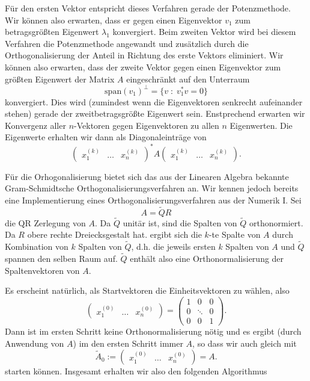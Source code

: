 \documentclass[12pt,a4paper]{book}
\theoremstyle{break}
\theoremstyle{nonumberplain}
\newcommand{\1}{\mathbbm{1}} 			      	%
\newcommand{\dd}{\; : \;}    			      	%
\begin{document}
Für den ersten Vektor entspricht dieses Verfahren gerade der Potenzmethode. Wir können also erwarten, dass er gegen einen Eigenvektor $v_1$
zum betragsgrößten Eigenwert $\lambda_1$ konvergiert. Beim zweiten Vektor wird bei diesem Verfahren die Potenzmethode angewandt und zusätzlich
durch die Orthogonalisierung der Anteil in Richtung des erste Vektors eliminiert. Wir können also erwarten, dass der zweite Vektor gegen einen Eigenvektor zum größten
Eigenwert der Matrix $A$ eingeschränkt auf den Unterraum
\[
\mathrm{span}(v_1)^\perp=\{ v\dd v_1^* v=0\}
\]
konvergiert. Dies wird (zumindest wenn die Eigenvektoren senkrecht aufeinander stehen) gerade der zweitbetragsgrößte Eigenwert sein. Enstprechend erwarten wir Konvergenz
aller $n$-Vektoren gegen Eigenvektoren zu allen $n$ Eigenwerten.
Die Eigenwerte erhalten wir dann als Diagonaleinträge von 
\[
\begin{pmatrix} x^{(k)}_1 & \ldots & x^{(k)}_n \end{pmatrix}^* A \begin{pmatrix} x^{(k)}_1 & \ldots & x^{(k)}_n \end{pmatrix}.
\]

Für die Orhogonalisierung bietet sich das aus der Linearen Algebra bekannte Gram-Schmidtsche Orthogonalisierungsverfahren an. Wir kennen jedoch bereits
eine Implementierung eines Orthogonalisierungsverfahren aus der Numerik I. Sei
\[
A=\tilde QR
\]
die QR Zerlegung von $A$. Da $\tilde Q$ unitär ist, sind die Spalten von $\tilde Q$ orthonormiert.  Da $R$ obere rechte Dreiecksgestalt hat. ergibt sich
die $k$-te Spalte von $A$ durch Kombination von $k$ Spalten von $\tilde Q$, d.h. die jeweils ersten $k$ Spalten von $A$ und $\tilde Q$ spannen den selben Raum auf.
$\tilde Q$ enthält also eine Orthonormalisierung der Spaltenvektoren von $A$.

Es erscheint natürlich, als Startvektoren die Einheitsvektoren zu wählen, also
\[
\begin{pmatrix} x^{(0)}_1 & \ldots & x^{(0)}_n \end{pmatrix}=\begin{pmatrix} 1 & 0 & 0\\ 0 & \ddots & 0\\ 0 & 0 & 1\end{pmatrix}.
\]
Dann ist im ersten Schritt keine Orthonormalisierung nötig und es ergibt (durch Anwendung von $A$) 
im den ersten Schritt immer $A$, so dass wir auch gleich mit 
\[
\tilde A_0:=\begin{pmatrix} x^{(0)}_1 & \ldots & x^{(0)}_n \end{pmatrix}=A.
\]
starten können. Insgesamt erhalten wir also den folgenden Algorithmus
\end{document}
